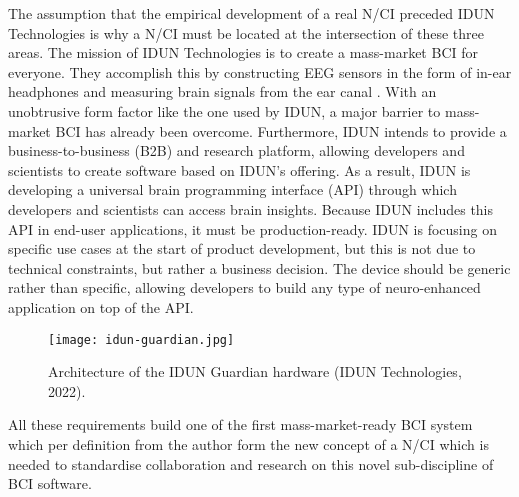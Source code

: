 The assumption that the empirical development of a real N/CI preceded IDUN Technologies is why a N/CI must be located at the intersection of these three areas. The mission of IDUN Technologies is to create a mass-market BCI for everyone. They accomplish this by constructing EEG sensors in the form of in-ear headphones and measuring brain signals from the ear canal \citep{idun_technologies_guardian_nodate}. With an unobtrusive form factor like the one used by IDUN, a major barrier to mass-market BCI has already been overcome. Furthermore, IDUN intends to provide a business-to-business (B2B) and research platform, allowing developers and scientists to create software based on IDUN's offering. As a result, IDUN is developing a universal brain programming interface (API) through which developers and scientists can access brain insights. Because IDUN includes this API in end-user applications, it must be production-ready. IDUN is focusing on specific use cases at the start of product development, but this is not due to technical constraints, but rather a business decision. The device should be generic rather than specific, allowing developers to build any type of neuro-enhanced application on top of the API.

\begin{figure}[!ht]
  \centering
  \texttt{[image: idun-guardian.jpg]}
  \caption{Architecture of the IDUN Guardian hardware (IDUN Technologies, 2022).}
  \label{fig:idun-guardian}
\end{figure}

All these requirements build one of the first mass-market-ready BCI system which per definition from the author form the new concept of a N/CI which is needed to standardise collaboration and research on this novel sub-discipline of BCI software.


